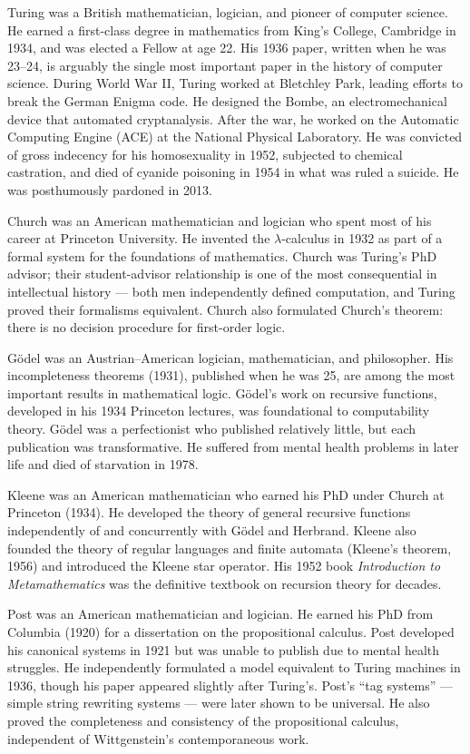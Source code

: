 Turing was a British mathematician, logician, and pioneer of computer science. He earned a first-class degree in mathematics from King's College, Cambridge in 1934, and was elected a Fellow at age 22. His 1936 paper, written when he was 23--24, is arguably the single most important paper in the history of computer science. During World War II, Turing worked at Bletchley Park, leading efforts to break the German Enigma code. He designed the Bombe, an electromechanical device that automated cryptanalysis. After the war, he worked on the Automatic Computing Engine (ACE) at the National Physical Laboratory. He was convicted of gross indecency for his homosexuality in 1952, subjected to chemical castration, and died of cyanide poisoning in 1954 in what was ruled a suicide. He was posthumously pardoned in 2013.

Church was an American mathematician and logician who spent most of his career at Princeton University. He invented the $\lambda$-calculus in 1932 as part of a formal system for the foundations of mathematics. Church was Turing's PhD advisor; their student-advisor relationship is one of the most consequential in intellectual history --- both men independently defined computation, and Turing proved their formalisms equivalent. Church also formulated Church's theorem: there is no decision procedure for first-order logic.

G\"odel was an Austrian--American logician, mathematician, and philosopher. His incompleteness theorems (1931), published when he was 25, are among the most important results in mathematical logic. G\"odel's work on recursive functions, developed in his 1934 Princeton lectures, was foundational to computability theory. G\"odel was a perfectionist who published relatively little, but each publication was transformative. He suffered from mental health problems in later life and died of starvation in 1978.

Kleene was an American mathematician who earned his PhD under Church at Princeton (1934). He developed the theory of general recursive functions independently of and concurrently with G\"odel and Herbrand. Kleene also founded the theory of regular languages and finite automata (Kleene's theorem, 1956) and introduced the Kleene star operator. His 1952 book \emph{Introduction to Metamathematics} was the definitive textbook on recursion theory for decades.

Post was an American mathematician and logician. He earned his PhD from Columbia (1920) for a dissertation on the propositional calculus. Post developed his canonical systems in 1921 but was unable to publish due to mental health struggles. He independently formulated a model equivalent to Turing machines in 1936, though his paper appeared slightly after Turing's. Post's ``tag systems'' --- simple string rewriting systems --- were later shown to be universal. He also proved the completeness and consistency of the propositional calculus, independent of Wittgenstein's contemporaneous work.


